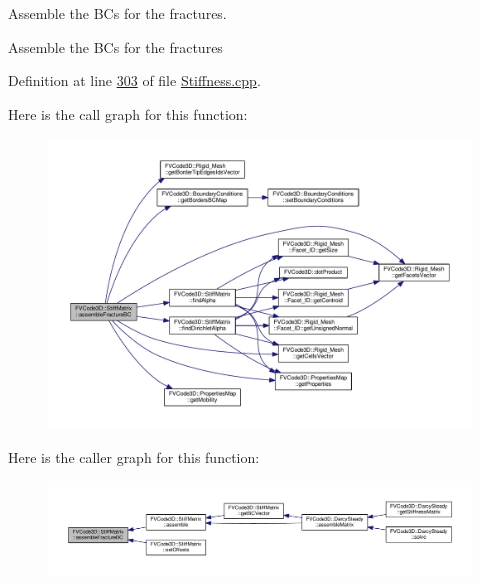 Assemble the B\+Cs for the fractures. 

Assemble the B\+Cs for the fractures 

Definition at line \hyperlink{Stiffness_8cpp_source_l00303}{303} of file \hyperlink{Stiffness_8cpp_source}{Stiffness.\+cpp}.



Here is the call graph for this function\+:
\nopagebreak
\begin{figure}[H]
\begin{center}
\leavevmode
\includegraphics[width=350pt]{classFVCode3D_1_1StiffMatrix_af7e80d2641fc41174eb4cb56e2f119d4_cgraph}
\end{center}
\end{figure}




Here is the caller graph for this function\+:
\nopagebreak
\begin{figure}[H]
\begin{center}
\leavevmode
\includegraphics[width=350pt]{classFVCode3D_1_1StiffMatrix_af7e80d2641fc41174eb4cb56e2f119d4_icgraph}
\end{center}
\end{figure}


